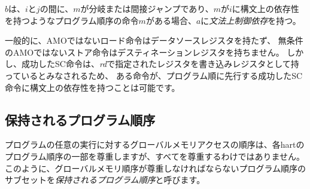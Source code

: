 \begin{comment}
$b$ has a {\em syntactic control dependency} on $a$ if there is an instruction $m$ program-ordered between $i$ and $j$ such that $m$ is a branch or indirect jump and $m$ has a syntactic dependency on $i$.
\end{comment}

$b$は、$i$と$j$の間に、$m$が分岐または間接ジャンプであり、$m$が$i$に構文上の依存性を持つようなプログラム順序の命令$m$がある場合、$a$に{\em 文法上制御依存}を持つ。

\begin{commentary}
\begin{comment}
  Generally speaking, non-AMO load instructions do not have data source registers, and unconditional non-AMO store instructions do not have destination registers.  However, a successful SC instruction is considered to have the register specified in {\em rd} as a destination register, and hence it is possible for an instruction to have a syntactic dependency on a successful SC instruction that precedes it in program order.
\end{comment}

  一般的に、AMOではないロード命令はデータソースレジスタを持たず、
無条件のAMOではないストア命令はデスティネーションレジスタを持ちません。
しかし、成功したSC命令は、{\em rd}で指定されたレジスタを書き込みレジスタとして持っているとみなされるため、
ある命令が、プログラム順に先行する成功したSC命令に構文上の依存性を持つことは可能です。
\end{commentary}

\begin{comment}
\subsection*{Preserved Program Order}
\end{comment}
\subsection*{保持されるプログラム順序}
\begin{comment}
The global memory order for any given execution of a program respects some but not all of each hart's program order.
The subset of program order that must be respected by the global memory order is known as {\em preserved program order}.
\end{comment}

プログラムの任意の実行に対するグローバルメモリアクセスの順序は、各hartのプログラム順序の一部を尊重しますが、すべてを尊重するわけではありません。
このように、グローバルメモリ順序が尊重しなければならないプログラム順序のサブセットを{\em 保持されるプログラム順序}と呼びます。

